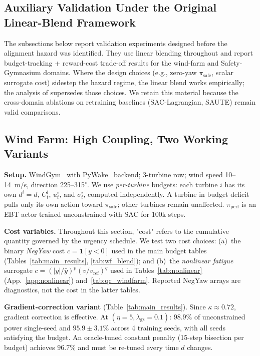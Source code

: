 \subsection*{Auxiliary Validation Under the Original Linear-Blend Framework}
\label{sec:auxiliary}

The subsections below report validation experiments designed before the alignment hazard was identified.
They use linear blending throughout and report budget-tracking + reward-cost trade-off results for the wind-farm and Safety-Gymnasium domains.
Where the design choices (e.g., zero-yaw $\pi_{\mathrm{safe}}$, scalar surrogate cost) sidestep the hazard regime, the linear blend works empirically; the analysis of  supersedes those choices.
We retain this material because the cross-domain ablations on retraining baselines (SAC-Lagrangian, SAUTE) remain valid comparisons.

\subsection{Wind Farm: High Coupling, Two Working Variants}
\label{sec:wf_results}

\textbf{Setup.}
WindGym~\citep{windgym} with PyWake~\citep{pywake} backend; 3-turbine row; wind speed 10--14~m/s, direction 225--315$^\circ$.
We use \emph{per-turbine} budgets: each turbine $i$ has its own $d^i\!=\!d$, $C_t^i$, $u_t^i$, and $\sigma_t^i$, computed independently.
A turbine in budget deficit pulls only its own action toward $\pi_{\mathrm{safe}}$; other turbines remain unaffected.
$\pi_{\mathrm{perf}}$ is an EBT actor trained unconstrained with SAC for 100k steps.

\textbf{Cost variables.}
Throughout this section, "cost" refers to the cumulative quantity governed by the urgency schedule.
We test two cost choices: (a)~the binary \emph{NegYaw} cost $c\!=\!\mathbf{1}[y\!<\!0]$ used in the main budget tables (Tables~\ref{tab:main_results}, \ref{tab:wf_blend}); and (b)~the \emph{nonlinear fatigue} surrogate $c\!=\!(|y|/\bar{y})^p(v/v_{\mathrm{ref}})^q$ used in Tables~\ref{tab:nonlinear} (App.~\ref{app:nonlinear}) and~\ref{tab:qc_windfarm}.
Reported NegYaw arrays are diagnostics, not the cost in the latter tables.

\textbf{Gradient-correction variant} (Table~\ref{tab:main_results}).
Since $\kappa\!\approx\!0.72$, gradient correction is effective.
At $(\eta\!=\!5, \lambda_{\mathrm{gs}}\!=\!0.1)$: $98.9\%$ of unconstrained power single-seed and $95.9\!\pm\!3.1\%$ across 4 training seeds, with all seeds satisfying the budget.
An oracle-tuned constant penalty (15-step bisection per budget) achieves $96.7\%$ and must be re-tuned every time $d$ changes.

